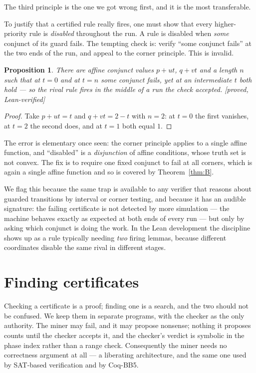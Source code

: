 \documentclass[11pt,a4paper]{article}
\theoremstyle{plain}
\newtheorem{proposition}[theorem]{Proposition}
\theoremstyle{definition}
\newcommand{\Lean}{\textcolor{linkc}{\textsf{[proved, Lean-verified]}}}
\begin{document}
The third principle is the one we got wrong first, and it is the most
transferable.

To justify that a certified rule really fires, one must show that every
higher-priority rule is \emph{disabled} throughout the run. A rule is
disabled when \emph{some} conjunct of its guard fails. The tempting check
is: verify ``some conjunct fails'' at the two ends of the run, and appeal
to the corner principle. This is invalid.

\begin{proposition}\label{prop:unsound}
There are affine conjunct values $p+ut$, $q+vt$ and a length $n$ such
that at $t=0$ and at $t=n$ some conjunct fails, yet at an intermediate
$t$ both hold --- so the rival rule fires in the middle of a run the
check accepted. \Lean
\end{proposition}
\begin{proof}
Take $p+ut = t$ and $q+vt = 2-t$ with $n=2$: at $t=0$ the first vanishes,
at $t=2$ the second does, and at $t=1$ both equal $1$.
\end{proof}

The error is elementary once seen: the corner principle applies to a
single affine function, and ``disabled'' is a \emph{disjunction} of
affine conditions, whose truth set is not convex. The fix is to require
one fixed conjunct to fail at all corners, which is again a single affine
function and so is covered by Theorem~\ref{thm:B}.

We flag this because the same trap is available to any verifier that
reasons about guarded transitions by interval or corner testing, and
because it has an audible signature: the failing certificate is not
detected by more simulation --- the machine behaves exactly as expected
at both ends of every run --- but only by asking which conjunct is doing
the work. In the Lean development the discipline shows up as a rule
typically needing \emph{two} firing lemmas, because different coordinates
disable the same rival in different stages.

\section{Finding certificates}\label{sec:mine}

Checking a certificate is a proof; finding one is a search, and the two
should not be confused. We keep them in separate programs, with the
checker as the only authority. The miner may fail, and it may propose
nonsense; nothing it proposes counts until the checker accepts it, and
the checker's verdict is symbolic in the phase index rather than a range
check. Consequently the miner needs no correctness argument at all --- a
liberating architecture, and the same one used by SAT-based verification
and by Coq-BB5.
\end{document}
